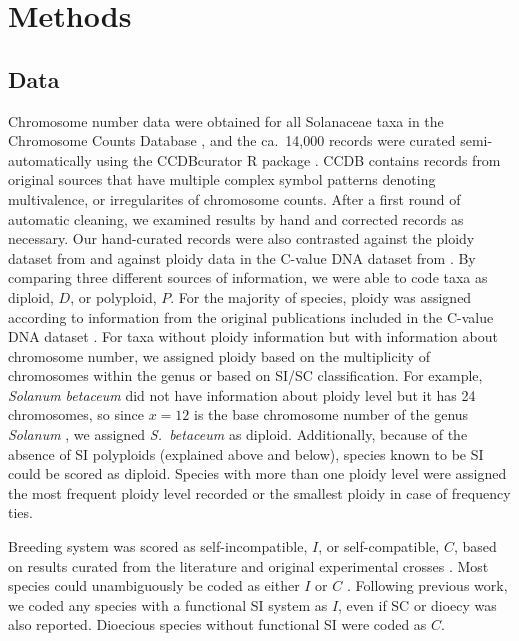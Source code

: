 \section{Methods}

\subsection{Data}


Chromosome number data were obtained for all Solanaceae taxa in the Chromosome Counts Database \citep[CCDB;][]{rice_2015}, and the ca.~14,000 records were curated semi-automatically using the CCDBcurator R package \citep{rivero_2019}.
CCDB contains records from original sources that have multiple complex symbol patterns denoting multivalence, or irregularites of chromosome counts.
After a first round of automatic cleaning, we examined results by hand and corrected records as necessary.
Our hand-curated records were also contrasted against the ploidy dataset from \citet{robertson_2011} and against ploidy data in the C-value DNA dataset from \citet{bennett_2005}.
By comparing three different sources of information, we were able to code taxa as diploid, $D$, or polyploid, $P$.
For the majority of species, ploidy was assigned according to information from the original publications included in the  C-value DNA dataset \citep{bennett_2005}.
For taxa without ploidy information but with information about chromosome number, we assigned ploidy based on the multiplicity of chromosomes within the genus or based on SI/SC classification.
For example, \textit{Solanum betaceum} did not have information about ploidy level but it has 24 chromosomes, so since $x=12$ is the base chromosome number of the genus \textit{Solanum} \citep{olmstead_2007}, we assigned \textit{S.~betaceum} as diploid. 
Additionally, because of the absence of SI polyploids (explained above and below), species known to be SI could be scored as diploid.
Species with more than one ploidy level were assigned the most frequent ploidy level recorded or the smallest ploidy in case of frequency ties.

Breeding system was scored as self-incompatible, $I$, or self-compatible, $C$, based on results curated from the literature and original experimental crosses \citep[as compiled in][]{igic_2006, goldberg_2010, robertson_2011, goldberg_2012}.
Most species could unambiguously be coded as either $I$ or $C$ \citep{raduski_2012}.
Following previous work, we coded any species with a functional SI system as $I$, even if SC or dioecy was also reported.
Dioecious species without functional SI were coded as $C$.


